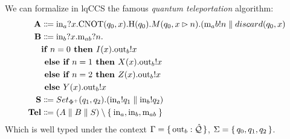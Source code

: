 \begin{example}
We can formalize in lqCCS the famous \textit{quantum teleportation} algorithm:
\begin{align*}
  \text{\textbf{A}} &\Coloneqq \text{in}_a?x.\text{CNOT}(q_0, x).\text{H}(q_0).M(q_0, x \rhd n).(\text{m}_ab!n \parallel discard(q_0, x)\\
  \text{\textbf{B}} &\Coloneqq \text{in}_b?x.\text{m}_{ab}?n.
     \\ & \textbf{if } n = 0 \textbf{ then } I(x).\text{out}_b!x\\& \textbf{ else } \textbf{if } n = 1 \textbf{ then } X(x).\text{out}_b!x\\& \textbf{ else } \textbf{if } n = 2 \textbf{ then } Z(x).\text{out}_b!x\\& \textbf{ else } Y(x).\text{out}_b!x
   \\
  \text{\textbf{S}} &\Coloneqq Set_{\Phi^+}(q_1, q_2).(\text{in}_a!q_1 \parallel \text{in}_b!q_2) \\
  \text{\textbf{Tel}} &\Coloneqq (A \parallel B \parallel S) \setminus \Set{\text{in}_a, \text{in}_b, \text{m}_{ab} }
\end{align*}
Which is well typed under the context 
$\Gamma = \set{\text{out}_b : \hat{\mathcal{Q}}}$, $\Sigma = \set{q_0, q_1, q_2}$.
\end{example}